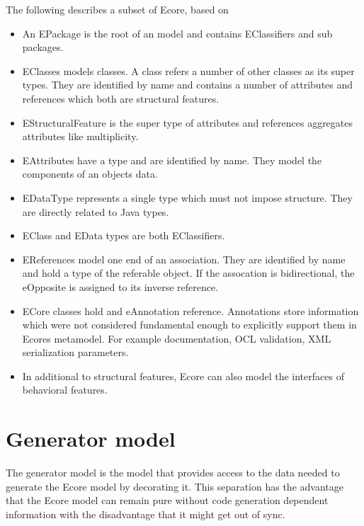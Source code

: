 

The following describes a subset of Ecore, based on \cite{EMF2nd} \\



\begin{itemize}
	\item An EPackage is the root of an model and contains EClassifiers and sub packages.
	\item EClasses models classes. A class refers a number of other classes as its super types. They are identified by name and contains a number of attributes and references which both are structural features.
	\item EStructuralFeature is the super type of attributes and references aggregates attributes like multiplicity.
	\item EAttributes have a type and are identified by name. They model the components of an objects data.
	\item EDataType represents a single type which must not impose structure. They are directly related to Java types.
	\item EClass and EData types are both EClassifiers.
	\item EReferences model one end of an association. They are identified by name and hold a type of the referable object. If the assocation is bidirectional, the eOpposite is assigned to its inverse reference. \cite{EMF2nd}
	\item ECore classes hold and eAnnotation reference. Annotations store information which were not considered fundamental enough to explicitly support them in Ecores metamodel. For example documentation, OCL validation, XML serialization parameters. \cite{EMP}
	\item In additional to structural features, Ecore can also model the interfaces of behavioral features.
\end{itemize}

\section{Generator model}
The generator model is the model that provides access to the data needed to generate the Ecore model by decorating it. This separation has the advantage that the Ecore model can remain pure without code generation dependent information with the disadvantage that it might get out of sync. \cite{EMF2nd}

